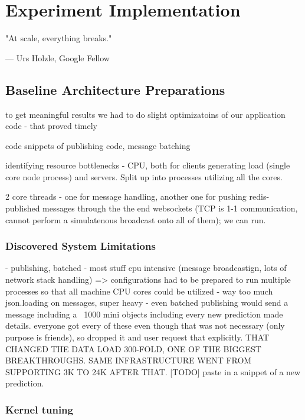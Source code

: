 \documentclass{uvamscse}
\begin{document}

\chapter{Experiment Implementation} \label{Experiment Implementation}

\epigraph{"At scale, everything breaks."}{--- Urs Holzle, Google Fellow}

\section{Baseline Architecture Preparations}\label{Baseline Architecture Preparations}
to get meaningful results we had to do slight optimizatoins of our application code - that proved timely

code snippets of publishing code, message batching

identifying resource bottlenecks - CPU, both for clients generating load (single core node process) and servers. Split up into processes utilizing all the cores.

2 core threads - one for message handling, another one for pushing redis-published messages through the the end websockets (TCP is 1-1 communication, cannot perform a simulatenous broadcast onto all of them); we can run.


\subsection{Discovered System Limitations}\label{Discovered System Limitations}
- publishing, batched
- most stuff cpu intensive (message broadcastign, lots of network stack handling) => configurations had to be prepared to run multiple processes so that all machine CPU cores could be utilized
- way too much json.loading on messages, super heavy
- even batched publishing would send a message including a ~1000 mini objects including every new prediction made details. everyone got every of these even though that was not necessary (only purpose is friends), so dropped it and user request that explicitly. THAT CHANGED THE DATA LOAD 300-FOLD, ONE OF THE BIGGEST BREAKTHROUGHS. SAME INFRASTRUCTURE WENT FROM SUPPORTING 3K TO 24K AFTER THAT. [TODO] paste in a snippet of a new prediction.

\subsection{Kernel tuning}\label{Kernel tuning}
\end{document}
